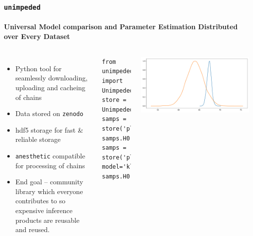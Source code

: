 \documentclass[aspectratio=169]{beamer}
\begin{document}
\begin{frame}[fragile]
    \frametitle{\texttt{unimpeded}}
    \framesubtitle{Universal Model comparison and Parameter Estimation Distributed over Every Dataset}
    \begin{columns}
    \begin{itemize}
        \item Python tool for seamlessly downloading, uploading and cacheing of chains
        \item Data stored on \texttt{zenodo} 
        \item hdf5 storage for fast \& reliable storage
        \item \texttt{anesthetic} compatible for processing of chains~
        \item End goal -- community library which everyone contributes to so expensive inference products are reusable and reused.
    \end{itemize}


\lstset{language=Python}
\lstset{frame=lines}
\lstset{basicstyle=\footnotesize}
\begin{lstlisting}
from unimpeded import Unimpeded
store = Unimpeded(cache='data.hdf5')
samps = store('planck')
samps.H0.plot.kde_1d()
samps = store('planck', model='klcdm')
samps.H0.plot.kde_1d()
\end{lstlisting}
\includegraphics[width=\textwidth]{figures/unimpeded.pdf}

        
    \end{columns}
\end{frame}



\newcommand{\movablecross}[1]{%
  \draw[->](#1) -- ++(0:\croslen);
  \draw[->](#1) -- ++(90:\croslen);
  \draw[->](#1) -- ++(180:\croslen);
  \draw[->](#1) -- ++(270:\croslen);
  \fill[red!70!black] (#1) circle (2pt);
}
\end{document}
